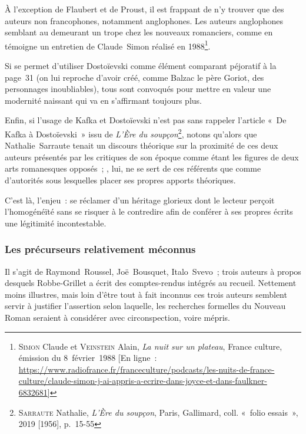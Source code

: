 \documentclass[12pt, a4paper]{article}
\begin{document}
À l'exception de Flaubert et de Proust, il est frappant de n'y trouver que des auteurs non francophones, notamment anglophones. Les auteurs anglophones semblant au demeurant un trope chez les nouveaux romanciers, comme en témoigne un entretien de Claude~Simon réalisé en 1988\footnote{\textsc{Simon} Claude et \textsc{Veinstein} Alain, \textit{La nuit sur un plateau}, France culture, émission du 8~février~1988 [En ligne~: \href{https://www.radiofrance.fr/franceculture/podcasts/les-nuits-de-france-culture/claude-simon-j-ai-appris-a-ecrire-dans-joyce-et-dans-faulkner-6832681}{https://www.radiofrance.fr/franceculture/podcasts/les-nuits-de-france-culture/claude-simon-j-ai-appris-a-ecrire-dans-joyce-et-dans-faulkner-6832681}]}.

Si \robbe{} se permet d'utiliser Dostoïevski comme élément comparant péjoratif à la page~31 (on lui reproche d'avoir créé, comme Balzac le père Goriot, des personnages inoubliables), tous sont convoqués pour mettre en valeur une modernité naissant qui va en s'affirmant toujours plus.

Enfin, si l'usage de Kafka et Dostoïevski n'est pas sans rappeler l'article «~De Kafka à Dostoïevski~» issu de \textit{L'Ère du soupçon}\footnote{\textsc{Sarraute} Nathalie, \textit{L'Ère du soupçon}, Paris, Gallimard, coll. «~folio essais~», 2019 [1956], p.~15-55
}, notons qu'alors que Nathalie~Sarraute tenait un discours théorique sur la proximité de ces deux auteurs présentés par les critiques de son époque comme étant les figures de deux arts romanesques opposés~; \robbe, lui, ne se sert de ces référents que comme d'autorités sous lesquelles placer ses propres apports théoriques.

C'est là, l'enjeu~: se réclamer d'un héritage glorieux dont le lecteur perçoit l'homogénéïté sans se risquer à le contredire afin de conférer à ses propres écrits une légitimité incontestable.

\subsubsection{Les précurseurs relativement méconnus}
Il s'agit de Raymond~Roussel, Joë~Bousquet, Italo~Svevo~; trois auteurs à propos desquels Robbe-Grillet a écrit des comptes-rendus intégrés au recueil. Nettement moins illustres, mais loin d'être tout à fait inconnus ces trois auteurs semblent servir à justifier l'assertion selon laquelle, les recherches formelles du Nouveau Roman seraient à considérer avec circonspection, voire mépris.
\end{document}
